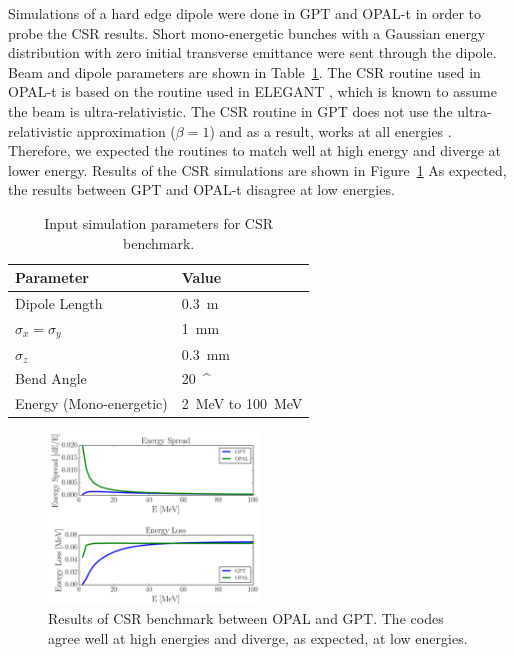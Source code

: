 Simulations of a hard edge dipole were done in GPT  
and OPAL-t in order to probe the CSR results.
Short mono-energetic bunches with a Gaussian energy distribution with zero initial transverse emittance  
were sent through the dipole.  
Beam and dipole parameters are shown in Table~\ref{tab:benchcsr}. 
The CSR routine used in OPAL-t is based on the routine used in ELEGANT \cite{elegant}, 
which is known to assume the beam is ultra-relativistic. The CSR routine in GPT  
does not use the ultra-relativistic approximation ($\beta=1$) 
and as a result, works at all energies \cite{gptcsr}.  
Therefore, we expected the routines to match well at high energy and  
diverge at lower energy. Results of the CSR simulations are shown in Figure~\ref{fig:csr}  
As expected, the results between GPT and OPAL-t disagree at low energies. 
\begin{table}
	\begin{center}
		\caption{Input simulation parameters for CSR benchmark.}
		\label{tab:benchcsr}
		\begin{tabular}{l l} 
			\toprule
			\toprule
			\textbf{Parameter} & \textbf{Value} \\ 
			\midrule
			Dipole Length & \SI{0.3}{m} \\
			$\sigma_x =\sigma_y$ & \SI{1}{mm} \\
			$\sigma_z$ 			 & \SI{0.3}{mm} \\
			Bend Angle 			 & \SI{20}{^\circ} \\
			Energy (Mono-energetic)	 & \SI{2}{MeV} to \SI{100}{MeV} \\
			\bottomrule			
		\end{tabular}
	\end{center}
\end{table}
\begin{figure}
	\centering
	\includegraphics[width=0.5\textwidth]{./images/CSR}
	\caption{Results of CSR benchmark between OPAL and GPT.
	The codes agree well at high energies and diverge, as expected, at low energies.}
	\label{fig:csr}
\end{figure}

